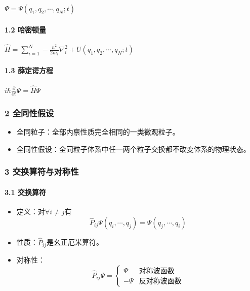 \documentclass[UTF8,twocolumn]{ctexart}
\providecommand{\tightlist}{%
  \setlength{\itemsep}{0pt}\setlength{\parskip}{0pt}}
\let\oldparagraph\paragraph
\renewcommand{\paragraph}[1]{\oldparagraph{#1}\mbox{}}
\begin{document}
\begin{center}
\(\Psi=\Psi(q_1,q_2,\cdots,q_N;t)\)
\end{center}

\hypertarget{ux54c8ux5bc6ux987fux91cf}{%
\paragraph{ 1.2 哈密顿量}\label{ux54c8ux5bc6ux987fux91cf}}

\begin{center}
\(\hat{H}=\sum_{i=1}^N-\frac{\hbar^2}{2m_i}\nabla_i^2+U(q_1,q_2,\cdots,q_N;t)\)
\end{center}

\hypertarget{ux859bux5b9aux8c14ux65b9ux7a0b}{%
\paragraph{ 1.3 薛定谔方程}\label{ux859bux5b9aux8c14ux65b9ux7a0b}}

\begin{center}
\(i\hbar\frac{\partial}{\partial t}\Psi=\hat{H}\Psi\)
\end{center}

\hypertarget{ux5168ux540cux6027ux5047ux8bbe}{%
\subsubsection{2 全同性假设}\label{ux5168ux540cux6027ux5047ux8bbe}}

\begin{itemize}
\tightlist
\item
  全同粒子：全部内禀性质完全相同的一类微观粒子。
\item
  全同性假设：全同粒子体系中任一两个粒子交换都不改变体系的物理状态。
\end{itemize}

\hypertarget{ux4ea4ux6362ux7b97ux7b26ux4e0eux5bf9ux79f0ux6027}{%
\subsubsection{3
交换算符与对称性}\label{ux4ea4ux6362ux7b97ux7b26ux4e0eux5bf9ux79f0ux6027}}

\hypertarget{ux4ea4ux6362ux7b97ux7b26}{%
\paragraph{ 3.1 交换算符}\label{ux4ea4ux6362ux7b97ux7b26}}

\begin{itemize}
\tightlist
\item
  定义：对\(\forall i\neq j\)有
  \[\hat{P}_{ij}\Psi(q_i,\cdots,q_j)=\Psi(q_j,\cdots,q_i)\]
\item
  性质：\(\hat{P}_{ij}\)是幺正厄米算符。
\item
  对称性： \[\hat{P}_{ij}\Psi=\begin{cases}
    \Psi & \mbox{对称波函数} \\
    -\Psi & \mbox{反对称波函数}
  \end{cases}\]
\end{itemize}
\end{document}

